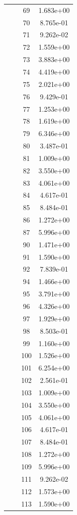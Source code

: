 \documentclass[12pt]{article}
\begin{document}
\begin{longtable}{@{}cccc@{}}
 &  & 69 & 1.683e+00 \\
 &  & 70 & 8.765e-01 \\
 &  & 71 & 9.262e-02 \\
 &  & 72 & 1.559e+00 \\
 &  & 73 & 3.883e+00 \\
 &  & 74 & 4.419e+00 \\
 &  & 75 & 2.021e+00 \\
 &  & 76 & 9.429e-01 \\
 &  & 77 & 1.253e+00 \\
 &  & 78 & 1.619e+00 \\
 &  & 79 & 6.346e+00 \\
 &  & 80 & 3.487e-01 \\
 &  & 81 & 1.009e+00 \\
 &  & 82 & 3.550e+00 \\
 &  & 83 & 4.061e+00 \\
 &  & 84 & 4.617e-01 \\
 &  & 85 & 8.484e-01 \\
 &  & 86 & 1.272e+00 \\
 &  & 87 & 5.996e+00 \\
 &  & 90 & 1.471e+00 \\
 &  & 91 & 1.590e+00 \\
 &  & 92 & 7.839e-01 \\
 &  & 94 & 1.466e+00 \\
 &  & 95 & 3.791e+00 \\
 &  & 96 & 4.326e+00 \\
 &  & 97 & 1.929e+00 \\
 &  & 98 & 8.503e-01 \\
 &  & 99 & 1.160e+00 \\
 &  & 100 & 1.526e+00 \\
 &  & 101 & 6.254e+00 \\
 &  & 102 & 2.561e-01 \\
 &  & 103 & 1.009e+00 \\
 &  & 104 & 3.550e+00 \\
 &  & 105 & 4.061e+00 \\
 &  & 106 & 4.617e-01 \\
 &  & 107 & 8.484e-01 \\
 &  & 108 & 1.272e+00 \\
 &  & 109 & 5.996e+00 \\
 &  & 111 & 9.262e-02 \\
 &  & 112 & 1.573e+00 \\
 &  & 113 & 1.590e+00 \\

\end{longtable}
\end{document}
